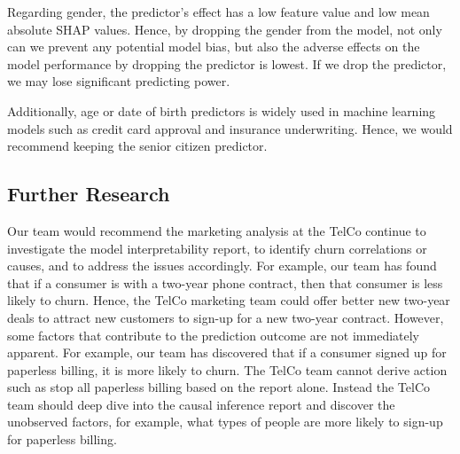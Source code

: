 \documentclass[12pt]{article}
\begin{document}
Regarding gender, the predictor's effect has a low feature value and low mean absolute SHAP values. Hence, by dropping the gender from the model, not only can we prevent any potential model bias, but also the adverse effects on the model performance by dropping the predictor is lowest. If we drop the predictor, we may lose significant predicting power. 

Additionally, age or date of birth predictors is widely used in machine learning models such as credit card approval and insurance underwriting. Hence, we would recommend keeping the senior citizen predictor.

\subsection{Further Research}

Our team would recommend the marketing analysis at the TelCo continue to investigate the model interpretability report, to identify churn correlations or causes, and to address the issues accordingly. For example, our team has found that if a consumer is with a two-year phone contract, then that consumer is less likely to churn. Hence, the TelCo marketing team could offer better new two-year deals to attract new customers to sign-up for a new two-year contract. However, some factors that contribute to the prediction outcome are not immediately apparent. For example, our team has discovered that if a consumer signed up for paperless billing, it is more likely to churn. The TelCo team cannot derive action such as stop all paperless billing based on the report alone. Instead the TelCo team should deep dive into the causal inference report and discover the unobserved factors, for example, what types of people are more likely to sign-up for paperless billing.  


\singlespacing
\setlength\bibsep{0pt}


\end{document}
